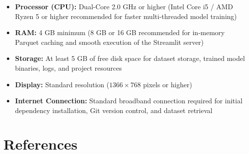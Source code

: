 \documentclass[12pt, a4paper]{article}
\renewcommand{\_}{\textunderscore\allowbreak}
\begin{document}
\begin{itemize}
    \item \textbf{Processor (CPU):} Dual-Core 2.0 GHz or higher (Intel Core i5 / AMD Ryzen 5 or higher recommended for faster multi-threaded model training)
    \item \textbf{RAM:} 4 GB minimum (8 GB or 16 GB recommended for in-memory Parquet caching and smooth execution of the Streamlit server)
    \item \textbf{Storage:} At least 5 GB of free disk space for dataset storage, trained model binaries, logs, and project resources
    \item \textbf{Display:} Standard resolution ($1366 \times 768$ pixels or higher)
    \item \textbf{Internet Connection:} Standard broadband connection required for initial dependency installation, Git version control, and dataset retrieval
\end{itemize}

\clearpage

\section{References}
\end{document}
